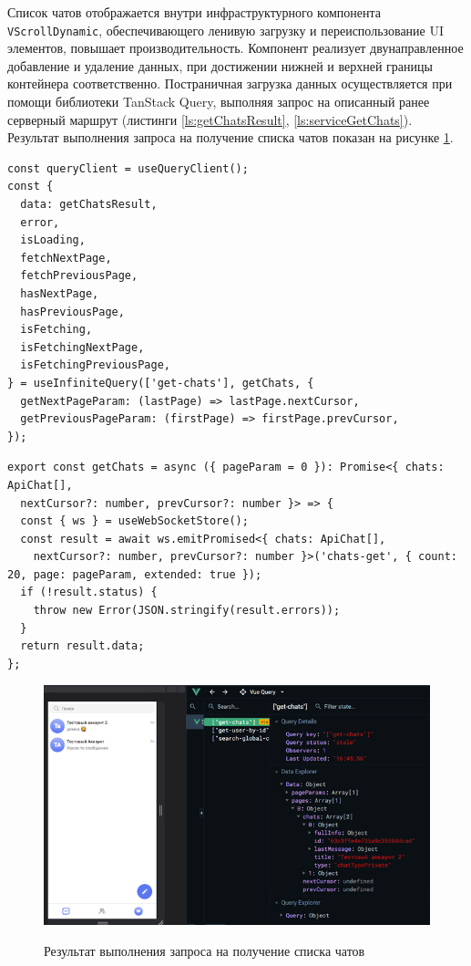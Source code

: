 Список чатов отображается внутри инфраструктурного компонента \verb|VScrollDynamic|, обеспечивающего ленивую загрузку и переиспользование UI элементов, повышает производительность. Компонент реализует двунаправленное добавление и удаление данных, при достижении нижней и верхней границы контейнера соответственно. Постраничная загрузка данных осуществляется при помощи библиотеки TanStack Query, выполняя запрос на описанный ранее серверный маршрут (листинги \ref{ls:getChatsResult}, \ref{ls:serviceGetChats}). Результат выполнения запроса на получение списка чатов показан на рисунке \ref{fig:web-app-get-chats-query}.

\begin{lstlisting}[caption={Использование TanStack Query для ленивой загрузки}, label={ls:getChatsResult}]
const queryClient = useQueryClient();
const {
  data: getChatsResult,
  error,
  isLoading,
  fetchNextPage,
  fetchPreviousPage,
  hasNextPage,
  hasPreviousPage,
  isFetching,
  isFetchingNextPage,
  isFetchingPreviousPage,
} = useInfiniteQuery(['get-chats'], getChats, {
  getNextPageParam: (lastPage) => lastPage.nextCursor,
  getPreviousPageParam: (firstPage) => firstPage.prevCursor,
});
\end{lstlisting}

\begin{lstlisting}[caption={Сервис запрашивающий список чатов}, label={ls:serviceGetChats}]
export const getChats = async ({ pageParam = 0 }): Promise<{ chats: ApiChat[],
  nextCursor?: number, prevCursor?: number }> => {
  const { ws } = useWebSocketStore();
  const result = await ws.emitPromised<{ chats: ApiChat[],
    nextCursor?: number, prevCursor?: number }>('chats-get', { count: 20, page: pageParam, extended: true });
  if (!result.status) {
    throw new Error(JSON.stringify(result.errors));
  }
  return result.data;
};
\end{lstlisting}

\begin{figure}[H]
\begin{center}
\includegraphics[width=1.0\hsize]{fig/web-app-get-chats-query.png}\\[2mm]
\caption{Результат выполнения запроса на получение списка чатов}\label{fig:web-app-get-chats-query}
\end{center}
\end{figure}


